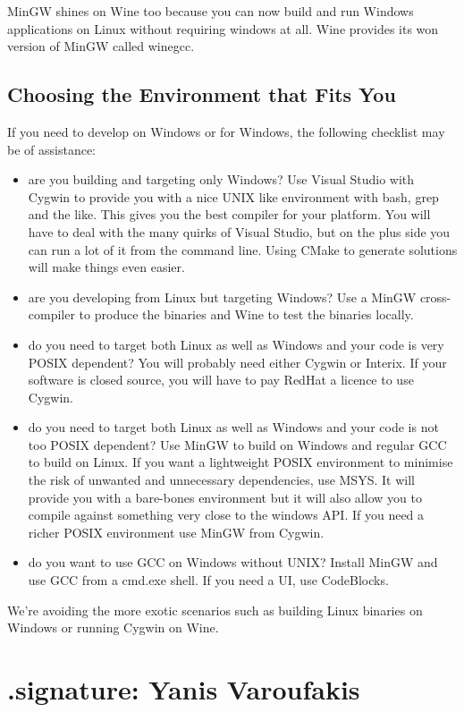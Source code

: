 \documentclass{book}
\begin{document}
MinGW shines on Wine too because you can now build and run Windows
applications on Linux without requiring windows at all. Wine provides
its won version of MinGW called winegcc.

\section{Choosing the Environment that Fits You}

If you need to develop on Windows or for Windows, the following
checklist may be of assistance:

\begin{itemize}
\item are you building and targeting only Windows? Use Visual Studio
  with Cygwin to provide you with a nice UNIX like environment with
  bash, grep and the like. This gives you the best compiler for your
  platform. You will have to deal with the many quirks of Visual
  Studio, but on the plus side you can run a lot of it from the
  command line. Using CMake to generate solutions will make things
  even easier.
\item are you developing from Linux but targeting Windows? Use a MinGW
  cross-compiler to produce the binaries and Wine to test the binaries
  locally.
\item do you need to target both Linux as well as Windows and your
  code is very POSIX dependent? You will probably need either Cygwin
  or Interix. If your software is closed source, you will have to pay
  RedHat a licence to use Cygwin.
\item do you need to target both Linux as well as Windows and your
  code is not too POSIX dependent? Use MinGW to build on Windows and
  regular GCC to build on Linux. If you want a lightweight POSIX
  environment to minimise the risk of unwanted and unnecessary
  dependencies, use MSYS. It will provide you with a bare-bones
  environment but it will also allow you to compile against something
  very close to the windows API. If you need a richer POSIX
  environment use MinGW from Cygwin.
\item do you want to use GCC on Windows without UNIX? Install MinGW
  and use GCC from a cmd.exe shell. If you need a UI, use CodeBlocks.
\end{itemize}

We're avoiding the more exotic scenarios such as building Linux
binaries on Windows or running Cygwin on Wine.

\chapter{.signature: Yanis Varoufakis}
\end{document}
